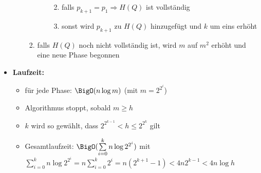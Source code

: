 \begin{itemize}
\begin{itemize}[itemsep=-2pt]
\begin{enumerate}[itemsep=-2pt]
\begin{itemize}
\begin{enumerate}
\begin{enumerate}
										\end{enumerate}
									\item falls $p_{k+1}=p_1 \Rightarrow H(Q)$ ist vollständig
									\item sonst wird $p_{k+1}$ zu $H(Q)$ hinzugefügt und $k$ um eins erhöht 
								\end{enumerate}
						\end{itemize}
					\item falls $H(Q)$ noch nicht vollständig ist, wird $m$ auf $m^2$ erhöht und eine neue Phase begonnen
				\end{enumerate}
		\end{itemize}
\end{itemize}
\topbreak
\up\up
\begin{itemize}
	\item \textbf{Laufzeit:}
		\begin{itemize}
			\item für jede Phase: $\BigO(n\log m)$ (mit $m=2^{2^i}$)
			\item Algorithmus stoppt, sobald $m\geq h$
			\item $k$ wird so gewählt, dass $2^{2^{k-1}}<h\leq 2^{2^k}$ gilt
			\item Gesamtlaufzeit: $\BigO(\sum\limits_{i=0}^{k}n\log 2^{2^i})$ mit $\sum\limits_{i=0}^{k}n\log 2^{2^i} = n\sum\limits_{i=0}^{k} 2^i = n(2^{k+1}-1)<4n2^{k-1}<4n\log h$
		\end{itemize}
\end{itemize}